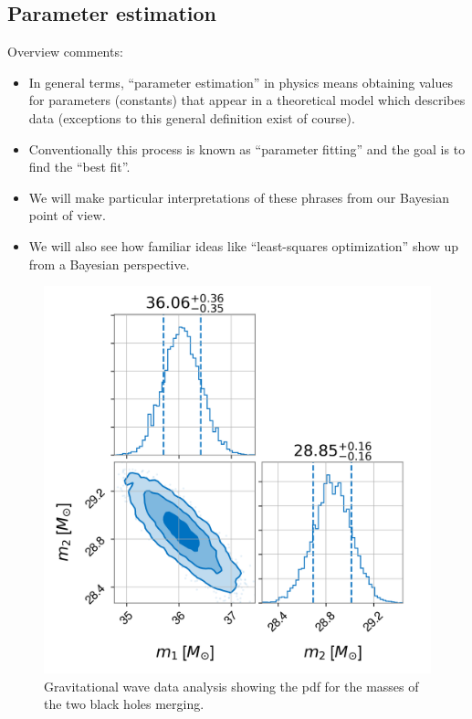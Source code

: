 \documentclass[%
oneside,                 %
final,                   %
10pt]{article}
\newenvironment{block_mdfboxadmon}[1][]{
\begin{block_mdfboxmdframed}[frametitle=#1]
}
{
\end{block_mdfboxmdframed}
}
\begin{document}
\subsection{Parameter estimation}

\begin{block_mdfboxadmon}[]
Overview comments:
\begin{itemize}
\item In general terms, ``parameter estimation'' in physics means obtaining values for parameters (constants) that appear in a theoretical model which describes data (exceptions to this general definition exist of course).

\item Conventionally this process is known as ``parameter fitting'' and the goal is to find the ``best fit''.

\item We will make particular interpretations of these phrases from our Bayesian point of view.

\item We will also see how familiar ideas like ``least-squares optimization'' show up from a Bayesian perspective.
\end{itemize}

\noindent
\end{block_mdfboxadmon} %




\begin{figure}[!ht]  %
  \centerline{\includegraphics[width=0.8\linewidth]{fig/m1m2.png}}
  \caption{
  Gravitational wave data analysis showing the pdf for the masses of the two black holes merging. \label{fig:gw}
  }
\end{figure}
\end{document}
